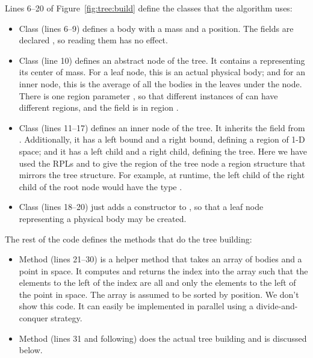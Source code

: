 Lines 6--20 of Figure~\ref{fig:tree:build} define the classes that the
algorithm uses:
%
\begin{itemize}
%
\item Class  (lines 6--9) defines a body with a mass and a
  position.  The fields are declared , so reading them has
  no effect.
%
\item Class  (line 10) defines an abstract node of the tree.
  It contains a  representing its center of mass.  For a
  leaf node, this is an actual physical body; and for an inner node,
  this is the average of all the bodies in the leaves under the node.
  There is one region parameter , so that different instances
  of  can have different regions, and the 
  field is in region .
%
\item Class  (lines 11--17) defines an inner node of
  the tree.  It inherits the  field from .
  Additionally, it has a left bound and a right bound, defining a
  region of 1-D space; and it has a left child and a right child,
  defining the tree.  Here we have used the RPLs  and
   to give the region of the tree node a region
  structure that mirrors the tree structure.  For example, at runtime,
  the left child of the right child of the root node would have the
  type .
%
\item Class  (lines 18--20) just adds a constructor to
  , so that a leaf node representing a physical body may be
  created.
\end{itemize}

The rest of the code defines the methods that do the tree building:
%
\begin{itemize}
%
\item Method  (lines 21--30) is a helper method
  that takes an array of bodies and a point in space.  It computes and
  returns the index into the array such that the elements to the left
  of the index are all and only the elements to the left of the point
  in space.  The array is assumed to be sorted by position.  We don't
  show this code.  It can easily be implemented in parallel using a
  divide-and-conquer strategy.
%
\item Method  (lines 31 and following) does the actual
  tree building and is discussed below.
%
\end{itemize}

